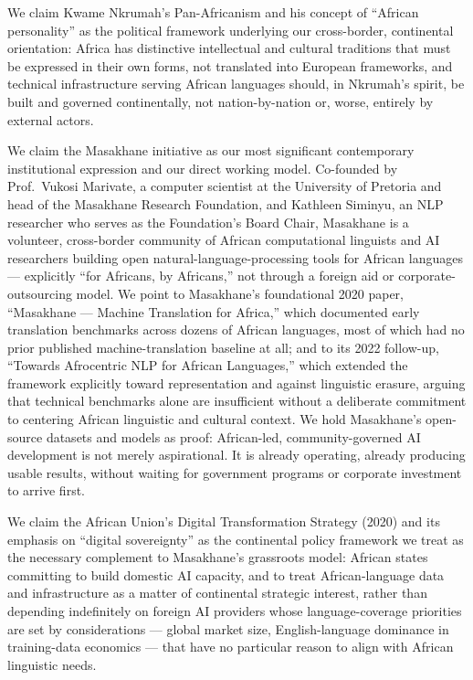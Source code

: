 We claim Kwame Nkrumah's Pan-Africanism and his concept of ``African
personality'' as the political framework underlying our cross-border,
continental orientation: Africa has distinctive intellectual and
cultural traditions that must be expressed in their own forms, not
translated into European frameworks, and technical infrastructure
serving African languages should, in Nkrumah's spirit, be built and
governed continentally, not nation-by-nation or, worse, entirely by
external actors.

We claim the Masakhane initiative as our most significant contemporary
institutional expression and our direct working model. Co-founded by
Prof.~Vukosi Marivate, a computer scientist at the University of
Pretoria and head of the Masakhane Research Foundation, and Kathleen
Siminyu, an NLP researcher who serves as the Foundation's Board Chair,
Masakhane is a volunteer, cross-border community of African
computational linguists and AI researchers building open
natural-language-processing tools for African languages --- explicitly
``for Africans, by Africans,'' not through a foreign aid or
corporate-outsourcing model. We point to Masakhane's foundational 2020
paper, ``Masakhane --- Machine Translation for Africa,'' which
documented early translation benchmarks across dozens of African
languages, most of which had no prior published machine-translation
baseline at all; and to its 2022 follow-up, ``Towards Afrocentric NLP
for African Languages,'' which extended the framework explicitly toward
representation and against linguistic erasure, arguing that technical
benchmarks alone are insufficient without a deliberate commitment to
centering African linguistic and cultural context. We hold Masakhane's
open-source datasets and models as proof: African-led,
community-governed AI development is not merely aspirational. It is
already operating, already producing usable results, without waiting for
government programs or corporate investment to arrive first.

We claim the African Union's Digital Transformation Strategy (2020) and
its emphasis on ``digital sovereignty'' as the continental policy
framework we treat as the necessary complement to Masakhane's grassroots
model: African states committing to build domestic AI capacity, and to
treat African-language data and infrastructure as a matter of
continental strategic interest, rather than depending indefinitely on
foreign AI providers whose language-coverage priorities are set by
considerations --- global market size, English-language dominance in
training-data economics --- that have no particular reason to align with
African linguistic needs.

